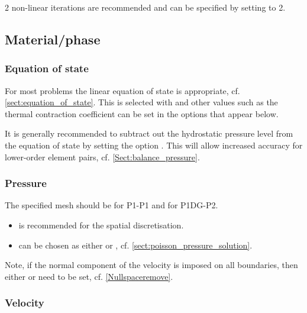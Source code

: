 2 non-linear iterations are recommended and can be specified by setting  to 2.

\subsection{Material/phase}


\subsubsection{Equation of state}

For most problems the linear equation of state is appropriate, cf. \ref{sect:equation_of_state}. This is selected with  and other values such as the thermal contraction coefficient can be set in the options that appear below. 

It is generally recommended to subtract out the hydrostatic pressure level from the equation of state by setting the option . This will allow increased accuracy for lower-order element pairs, cf. \ref{Sect:balance_pressure}.

\subsubsection{Pressure}

The specified mesh should be  for P1-P1 and  for P1DG-P2. 

\begin{itemize}
\item {} is recommended for the spatial discretisation. 
\item {} can be chosen as either  or , cf. \ref{sect:poisson_pressure_solution}.
\end{itemize}

Note, if the normal component of the velocity is imposed on all boundaries, then either  or  need to be set, cf. \ref{Nullspaceremove}.

\subsubsection{Velocity}

